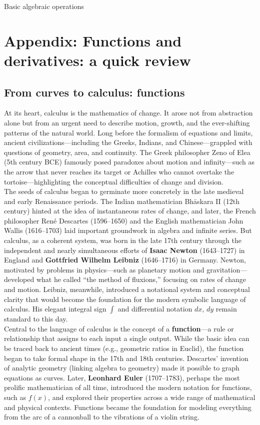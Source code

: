 \documentclass{book}
\begin{document}
Basic algebraic operations



\chapter{Appendix: Functions and derivatives: a quick review}

\section{From curves to calculus: functions}

At its heart, calculus is the mathematics of change. It arose not from abstraction alone but from an urgent need to describe motion, growth, and the ever-shifting patterns of the natural world. Long before the formalism of equations and limits, ancient civilizations---including the Greeks, Indians, and Chinese---grappled with questions of geometry, area, and continuity. The Greek philosopher Zeno of Elea (5th century BCE) famously posed paradoxes about motion and infinity---such as the arrow that never reaches its target or Achilles who cannot overtake the tortoise---highlighting the conceptual difficulties of change and division.\\

The seeds of calculus began to germinate more concretely in the late medieval and early Renaissance periods. The Indian mathematician Bhāskara II (12th century) hinted at the idea of instantaneous rates of change, and later, the French philosopher René Descartes (1596--1650) and the English mathematician John Wallis (1616--1703) laid important groundwork in algebra and infinite series. But calculus, as a coherent system, was born in the late 17th century through the independent and nearly simultaneous efforts of \textbf{Isaac Newton} (1643--1727) in England and \textbf{Gottfried Wilhelm Leibniz} (1646--1716) in Germany. Newton, motivated by problems in physics---such as planetary motion and gravitation---developed what he called ``the method of fluxions,'' focusing on rates of change and motion. Leibniz, meanwhile, introduced a notational system and conceptual clarity that would become the foundation for the modern symbolic language of calculus. His elegant integral sign $\int$ and differential notation $dx$, $dy$ remain standard to this day.\\

Central to the language of calculus is the concept of a \textbf{function}---a rule or relationship that assigns to each input a single output. While the basic idea can be traced back to ancient times (e.g., geometric ratios in Euclid), the function began to take formal shape in the 17th and 18th centuries. Descartes’ invention of analytic geometry (linking algebra to geometry) made it possible to graph equations as curves. Later, \textbf{Leonhard Euler} (1707--1783), perhaps the most prolific mathematician of all time, introduced the modern notation for functions, such as $f(x)$, and explored their properties across a wide range of mathematical and physical contexts. Functions became the foundation for modeling everything from the arc of a cannonball to the vibrations of a violin string.\\
\end{document}
